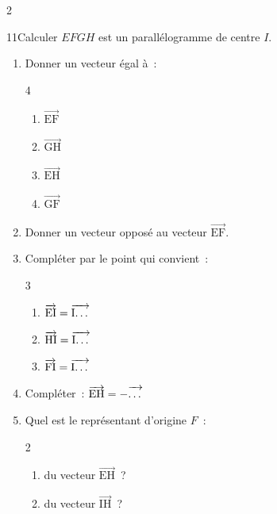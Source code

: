 \documentclass[10pt,a4paper]{article}
\newcommand{\starfull}[1]{{\color{#1}\ding{72}}}
\newcommand{\starempty}{{\color{gray!45}\ding{73}}}
\newcommand{\Vj}[1]{\overrightarrow{\text{#1}}}
\begin{document}
\begin{multicols}{2}
\begin{Exo}{11}{\starfull{diffgreen}\starempty\starempty}{Calculer}
$EFGH$ est un parall\'elogramme de centre $I$.
\begin{enumerate}
\item Donner un vecteur \'egal \`a~:
\vspace*{-0.8em}
\begin{multicols}{4}
\begin{enumerate}[label=(\alph*)]
\item $\Vj{EF}$
\item $\Vj{GH}$
\item $\Vj{EH}$
\item $\Vj{GF}$
\end{enumerate}
\end{multicols}
\item Donner un vecteur oppos\'e au vecteur $\Vj{EF}$.
\item Compl\'eter par le point qui convient~:
\vspace*{-0.8em}
\begin{multicols}{3}
\begin{enumerate}[label=(\alph*)]
\item $\Vj{EI}=\Vj{I\dots}$
\item $\Vj{HI}=\Vj{I\dots}$
\item $\Vj{FI}=\Vj{I\dots}$
\end{enumerate}
\end{multicols}
\item Compl\'eter~: $\Vj{EH}=-\Vj{\vphantom{H}\dots}$
\item Quel est le repr\'esentant d'origine $F$~:
\vspace*{-0.8em}
\begin{multicols}{2}
\begin{enumerate}[label=(\alph*)]
\item du vecteur $\Vj{EH}$~?
\item du vecteur $\Vj{IH}$~?
\end{enumerate}
\end{multicols}
\end{enumerate}
\end{Exo}


\end{multicols}
\end{document}
